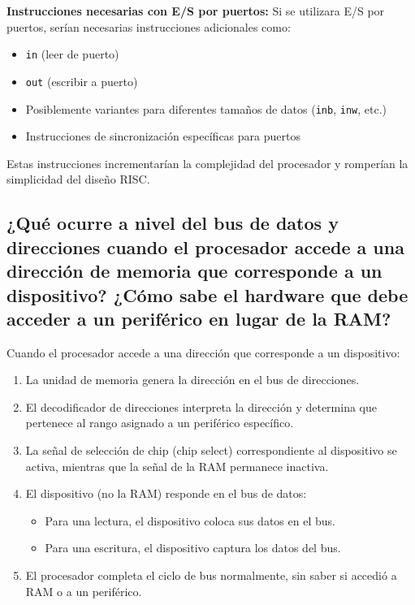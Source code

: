 \documentclass[12pt]{article}
\begin{document}
	\textbf{Instrucciones necesarias con E/S por puertos:} Si se utilizara E/S por puertos, serían necesarias instrucciones adicionales como:
	\begin{itemize}
		\item \texttt{in} (leer de puerto)
		\item \texttt{out} (escribir a puerto)
		\item Posiblemente variantes para diferentes tamaños de datos (\texttt{inb}, \texttt{inw}, etc.)
		\item Instrucciones de sincronización específicas para puertos
	\end{itemize}
	
	Estas instrucciones incrementarían la complejidad del procesador y romperían la simplicidad del diseño RISC.
	
	
	\subsection{¿Qué ocurre a nivel del bus de datos y direcciones cuando el procesador accede a una dirección de memoria que corresponde a un dispositivo? ¿Cómo sabe el hardware que debe acceder a un periférico en lugar de la RAM?}
	
	Cuando el procesador accede a una dirección que corresponde a un dispositivo:
	
	\begin{enumerate}
		\item La unidad de memoria genera la dirección en el bus de direcciones.
		\item El decodificador de direcciones interpreta la dirección y determina que pertenece al rango asignado a un periférico específico.
		\item La señal de selección de chip (chip select) correspondiente al dispositivo se activa, mientras que la señal de la RAM permanece inactiva.
		\item El dispositivo (no la RAM) responde en el bus de datos:
		\begin{itemize}
			\item Para una lectura, el dispositivo coloca sus datos en el bus.
			\item Para una escritura, el dispositivo captura los datos del bus.
		\end{itemize}
		\item El procesador completa el ciclo de bus normalmente, sin saber si accedió a RAM o a un periférico.
	\end{enumerate}
	
\end{document}

